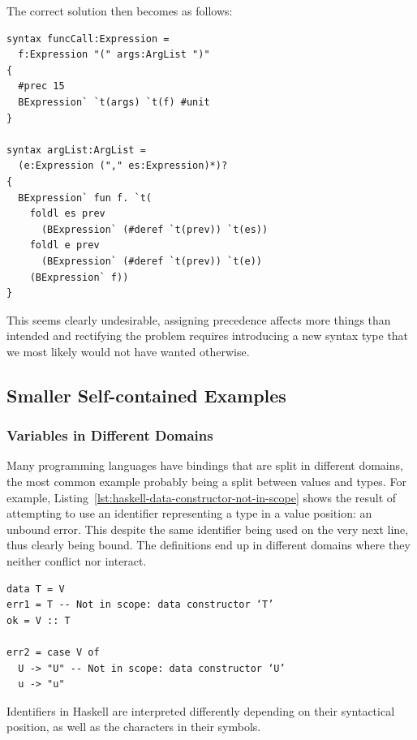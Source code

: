\documentclass{kththesis}
\begin{document}
The correct solution then becomes as follows:

\begin{verbatim}
syntax funcCall:Expression =
  f:Expression "(" args:ArgList ")"
{
  #prec 15
  BExpression` `t(args) `t(f) #unit
}

syntax argList:ArgList =
  (e:Expression ("," es:Expression)*)?
{
  BExpression` fun f. `t(
    foldl es prev
      (BExpression` (#deref `t(prev)) `t(es))
    foldl e prev
      (BExpression` (#deref `t(prev)) `t(e))
    (BExpression` f))
}
\end{verbatim}

This seems clearly undesirable, assigning precedence affects more things than intended and rectifying the problem requires introducing a new syntax type that we most likely would not have wanted otherwise.

\subsection{Smaller Self-contained Examples}

\subsubsection{Variables in Different Domains}


Many programming languages have bindings that are split in different domains, the most common example probably being a split between values and types. For example, Listing~\ref{lst:haskell-data-constructor-not-in-scope} shows the result of attempting to use an identifier representing a type in a value position: an unbound error. This despite the same identifier being used on the very next line, thus clearly being bound. The definitions end up in different domains where they neither conflict nor interact.

\begin{listing}[h]
\begin{verbatim}
data T = V
err1 = T -- Not in scope: data constructor ‘T’
ok = V :: T

err2 = case V of
  U -> "U" -- Not in scope: data constructor ‘U’
  u -> "u"
\end{verbatim}
\caption{Identifiers in Haskell are interpreted differently depending on their syntactical position, as well as the characters in their symbols.}
\label{lst:haskell-data-constructor-not-in-scope}
\end{listing}
\end{document}
